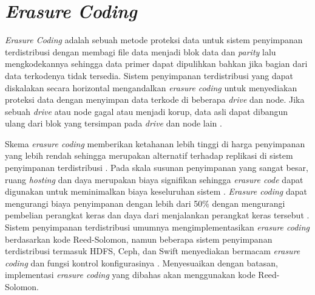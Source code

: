 \section{\textit{Erasure Coding}}

\textit{Erasure Coding} adalah sebuah metode proteksi data untuk sistem penyimpanan terdistribusi dengan membagi file data menjadi blok data dan \textit{parity} lalu mengkodekannya sehingga data primer dapat dipulihkan bahkan jika bagian dari data terkodenya tidak tersedia. Sistem penyimpanan terdistribusi yang dapat diskalakan secara horizontal mengandalkan \textit{erasure coding} untuk menyediakan proteksi data dengan menyimpan data terkode di beberapa \textit{drive} dan node. Jika sebuah \textit{drive} atau node gagal atau menjadi korup, data asli dapat dibangun ulang dari blok yang tersimpan pada \textit{drive} dan node lain \parencite{minio2022erasure}.

Skema \textit{erasure coding} memberikan ketahanan lebih tinggi di harga penyimpanan yang lebih rendah sehingga merupakan alternatif terhadap replikasi di sistem penyimpanan terdistribusi \parencite{silberstein2014lazy}. Pada skala susunan penyimpanan yang sangat besar, ruang \textit{hosting} dan daya merupakan biaya signifikan sehingga \textit{erasure code} dapat digunakan untuk meminimalkan biaya keseluruhan sistem \parencite{manasse2009reed}. \textit{Erasure coding} dapat mengurangi biaya penyimpanan dengan lebih dari 50\% dengan mengurangi pembelian perangkat keras dan daya dari menjalankan perangkat keras tersebut \parencite{huang2012erasure}. Sistem penyimpanan terdistribusi umumnya mengimplementasikan \textit{erasure coding} berdasarkan kode Reed-Solomon, namun beberapa sistem penyimpanan terdistribusi termasuk HDFS, Ceph, dan Swift menyediakan bermacam \textit{erasure coding} dan fungsi kontrol konfigurasinya \parencite{kim2021erasure}. Menyesuaikan dengan batasan, implementasi \textit{erasure coding} yang dibahas akan menggunakan kode Reed-Solomon.





